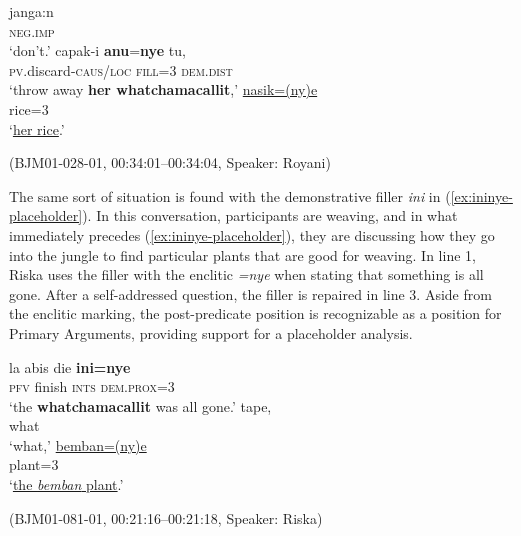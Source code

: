 \documentclass[output=paper,
\ChapterDOI{10.5281/zenodo.15697583}
colorlinks,
citecolor=brown]{langscibook}
\begin{document}
\begin{exe}
    \ex\label{ex:anunye-placeholder} 
    \begin{xlist}[0\quad →A:]
        \gll janga:n\\
        \textsc{neg.imp}\\
        \trans `don't.'
        \gll  capak-i \textbf{anu}=\textbf{nye} tu,\\
        \textsc{pv}.discard-\textsc{caus/loc} \textsc{fill}=\textsc{3} \textsc{dem.dist}\\
        \trans `throw away \textbf{her whatchamacallit},'
        \exi{3\quad \hphantom{→R:}}
        \gll  \uline{nasik=(ny)e}\\
        rice=\textsc{3}\\
        \trans `\uline{her rice}.'
    \end{xlist}
    \hfill (BJM01-028-01, 00:34:01--00:34:04, Speaker: Royani)
\end{exe}

The same sort of situation is found with the demonstrative filler \textit{ini} in (\ref{ex:ininye-placeholder}). In this conversation, participants are weaving, and in what immediately precedes (\ref{ex:ininye-placeholder}), they are discussing how they go into the jungle to find particular plants that are good for weaving. In line 1, Riska uses the filler with the enclitic \textit{=nye} when stating that something is all gone. After a self-addressed question, the filler is repaired in line 3. Aside from the enclitic marking, the post-predicate position is recognizable as a position for Primary Arguments, providing support for a placeholder analysis.

\begin{exe}
    \ex\label{ex:ininye-placeholder} 
    \begin{xlist}[0\quad →A:]
        \gll la abis die \textbf{ini=nye}\\
        \textsc{pfv} finish \textsc{ints} \textsc{dem.prox=3}\\
        \trans `the \textbf{whatchamacallit} was all gone.'
        \exi{2\quad \hphantom{→R:}}
        \gll  tape,\\
         what \\
        \trans `what,'
        \exi{3\quad \hphantom{→R:}}
        \gll  \uline{bemban=(ny)e}\\
        plant=3\\
        \trans `\uline{the \textit{bemban} plant}.'
    \end{xlist}
    \hfill (BJM01-081-01, 00:21:16--00:21:18, Speaker: Riska)
\end{exe}
\end{document}
